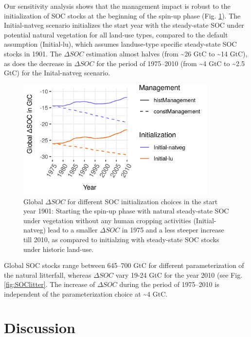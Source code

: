 \documentclass[gc, manuscript]{copernicus}
\begin{document}
Our sensitivity analysis shows that the management impact is robust to the initialization of SOC stocks at the beginning of the spin-up phase (Fig. \ref{fig:SOCinit}). The Initial-natveg scenario initializes the start year with the steady-state SOC under potential natural vegetation for all land-use types, compared to the default assumption (Initial-lu), which assumes landuse-type specific steady-state SOC stocks in 1901. The \(\Delta SOC\) estimation almost halves (from \textasciitilde26 GtC to \textasciitilde14 GtC), as does the decrease in \(\Delta SOC\) for the period of 1975--2010 (from \textasciitilde4 GtC to \textasciitilde2.5 GtC) for the Inital-natveg scenario.

\begin{figure}
\includegraphics[width=10cm]{../ResultNotebooks/Output/Images/scenario_init} \caption{Global $\Delta SOC$ for different SOC initialization choices in the start year 1901: Starting the spin-up phase with natural steady-state SOC under vegetation without any human cropping activities (Initial-natveg) lead to a smaller $\Delta SOC$ in 1975 and a less steeper increase till 2010, as compared to initialzing with steady-state SOC stocks under historic land-use.}\label{fig:SOCinit}
\end{figure}

Global SOC stocks range between 645--700 GtC for different parameterization of the natural litterfall, whereas \(\Delta SOC\) vary 19-24 GtC for the year 2010 (see Fig. \ref{fig:SOClitter}. The increase of \(\Delta SOC\) during the period of 1975--2010 is independent of the parameterization choice at \textasciitilde4 GtC.

\newpage

\hypertarget{discussion}{%
\section{Discussion}\label{discussion}}
\end{document}
